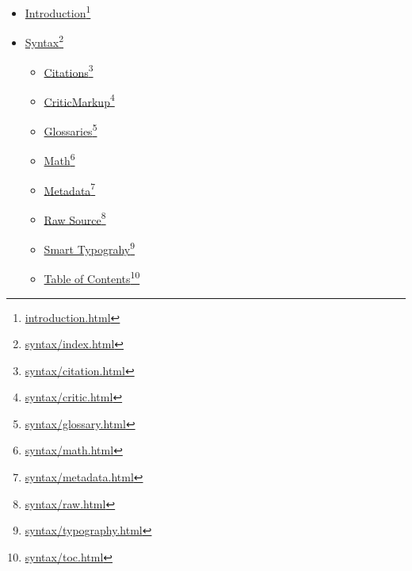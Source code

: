 \begin{itemize}
\item \href{introduction.html}{Introduction}\footnote{\href{introduction.html}{introduction.html}}

\item \href{syntax/index.html}{Syntax}\footnote{\href{syntax/index.html}{syntax\slash index.html}}

\begin{itemize}
\item \href{syntax/citation.html}{Citations}\footnote{\href{syntax/citation.html}{syntax\slash citation.html}}

\item \href{syntax/critic.html}{CriticMarkup}\footnote{\href{syntax/critic.html}{syntax\slash critic.html}}

\item \href{syntax/glossary.html}{Glossaries}\footnote{\href{syntax/glossary.html}{syntax\slash glossary.html}}

\item \href{syntax/math.html}{Math}\footnote{\href{syntax/math.html}{syntax\slash math.html}}

\item \href{syntax/metadata.html}{Metadata}\footnote{\href{syntax/metadata.html}{syntax\slash metadata.html}}

\item \href{syntax/raw.html}{Raw Source}\footnote{\href{syntax/raw.html}{syntax\slash raw.html}}

\item \href{syntax/typography.html}{Smart Typograhy}\footnote{\href{syntax/typography.html}{syntax\slash typography.html}}

\item \href{syntax/toc.html}{Table of Contents}\footnote{\href{syntax/toc.html}{syntax\slash toc.html}}

\end{itemize}

\end{itemize}



